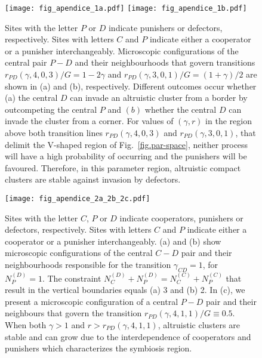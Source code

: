 \documentclass[5p]{elsarticle}
\def\NCC{N^{{\scriptscriptstyle(C)}}_{C}}
\def\NCP{N^{{\scriptscriptstyle(C)}}_{P}}
\def\NDP{N^{{\scriptscriptstyle(D)}}_{P}}
\def\NDC{N^{{\scriptscriptstyle(D)}}_{C}}
\begin{document}
\begin{figure}[H]
\begin{center}
\texttt{[image: fig\_apendice\_1a.pdf]}\hspace{0.3cm}
\texttt{[image: fig\_apendice\_1b.pdf]} 
\caption{Sites with the letter $P$ or $D$ indicate punishers or defectors, respectively. Sites with letters $C$ and $P$ indicate either a cooperator or a punisher interchangeably. Microscopic configurations of the central pair $P-D$ and their neighbourhoods that govern transitions $r_{PD}(\gamma, 4, 0, 3)/G=1-2\gamma$ and  $r_{PD}(\gamma, 3, 0, 1)/G=(1+\gamma)/2$ are shown in (a) and  (b), respectively. Different outcomes occur whether (a) the central $D$ can invade an altruistic cluster from a border by outcompeting the central $P$ and $(b)$ whether the central $D$ can invade the cluster from a corner. For values of $(\gamma,r)$ in the region above both transition lines $r_{PD}(\gamma, 4, 0, 3)$ and  $r_{PD}(\gamma, 3, 0, 1)$, that delimit the V-shaped region of Fig.~\ref{fig.par-space}, neither process will have a high probability of occurring and the punishers will be favoured. Therefore, in this parameter region, altruistic compact clusters are stable against invasion by defectors.}
\label{fig.append.config.PD}
\end{center}
\end{figure}

\begin{figure}[H]

\begin{center}
\texttt{[image: fig\_apendice\_2a\_2b\_2c.pdf]} 
\caption{Sites with the letter $C$, $P$ or $D$ indicate cooperators, punishers or defectors, respectively. Sites with letters $C$ and $P$ indicate either a cooperator or a punisher interchangeably. (a) and (b) show microscopic configurations of the central $C-D$ pair and their neighbourhoods responsible for the transition $\gamma_{CD} = 1$, for $\NDP=1$. The constraint $\NDC+\NDP=\NCC+\NCP$ that result in the vertical boundaries equals (a) 3 and (b) 2.   In (c), we present a microscopic configuration of a central $P-D$ pair and their neighbours that govern the transition $r_{PD}(\gamma, 4, 1, 1)/G\equiv 0.5$. When both $\gamma>1$ and $r>r_{PD}(\gamma, 4, 1, 1)$, altruistic clusters are stable and can grow due to the interdependence of cooperators and punishers which characterizes the symbiosis region. }
\label{fig.append.config.CD} 
\end{center}
\end{figure}
\end{document}
